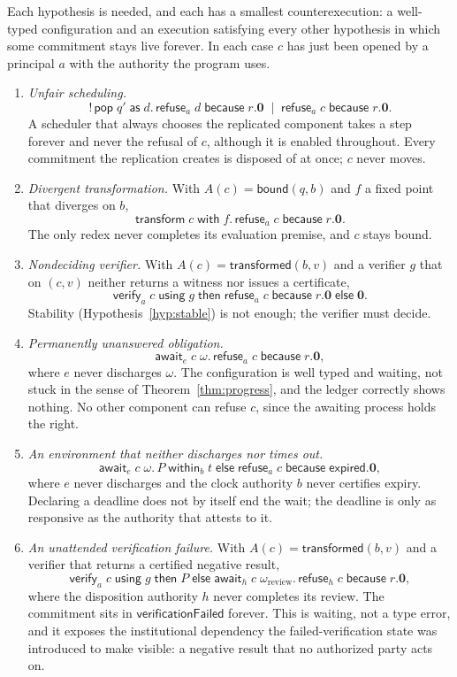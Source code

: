 \documentclass[11pt,openany]{book}
\theoremstyle{remark}
\begin{document}
Each hypothesis is needed, and each has a smallest counterexecution: a
well-typed configuration and an execution satisfying every other
hypothesis in which some commitment stays live forever. In each case $c$
has just been opened by a principal $a$ with the authority the program
uses.
\begin{enumerate}[leftmargin=1.5em]
\item \emph{Unfair scheduling.}
\[
!\,\mathsf{pop}\;q'\;\mathsf{as}\;d.\,\mathsf{refuse}_a\;d\;\mathsf{because}\;r.\mathbf 0
\;\mid\;\mathsf{refuse}_a\;c\;\mathsf{because}\;r.\mathbf 0 .
\]
A scheduler that always chooses the replicated component takes a step
forever and never the refusal of $c$, although it is enabled throughout.
Every commitment the replication creates is disposed of at once; $c$
never moves.
\item \emph{Divergent transformation.} With $A(c)=\mathsf{bound}(q,b)$ and
$f$ a fixed point that diverges on $b$,
\[
\mathsf{transform}\;c\;\mathsf{with}\;f.\,\mathsf{refuse}_a\;c\;\mathsf{because}\;r.\mathbf 0 .
\]
The only redex never completes its evaluation premise, and $c$ stays
bound.
\item \emph{Nondeciding verifier.} With $A(c)=\mathsf{transformed}(b,v)$
and a verifier $g$ that on $(c,v)$ neither returns a witness nor issues a
certificate,
\[
\mathsf{verify}_a\;c\;\mathsf{using}\;g\;\mathsf{then}\;
\mathsf{refuse}_a\;c\;\mathsf{because}\;r.\mathbf 0\;\mathsf{else}\;\mathbf 0 .
\]
Stability (Hypothesis~\ref{hyp:stable}) is not enough; the verifier must
decide.
\item \emph{Permanently unanswered obligation.}
\[
\mathsf{await}_e\;c\;\omega.\,\mathsf{refuse}_a\;c\;\mathsf{because}\;r.\mathbf 0,
\]
where $e$ never discharges $\omega$. The configuration is well typed and
waiting, not stuck in the sense of Theorem~\ref{thm:progress}, and the
ledger correctly shows nothing. No other component can refuse $c$, since
the awaiting process holds the right.
\item \emph{An environment that neither discharges nor times out.}
\[
\mathsf{await}_e\;c\;\omega.\,P\;\mathsf{within}_b\;t\;\mathsf{else}\;
\mathsf{refuse}_a\;c\;\mathsf{because}\;\mathsf{expired}.\mathbf 0,
\]
where $e$ never discharges and the clock authority $b$ never certifies
expiry. Declaring a deadline does not by itself end the wait; the
deadline is only as responsive as the authority that attests to it.
\item \emph{An unattended verification failure.} With
$A(c)=\mathsf{transformed}(b,v)$ and a verifier that returns a certified
negative result,
\[
\mathsf{verify}_a\;c\;\mathsf{using}\;g\;\mathsf{then}\;P\;\mathsf{else}\;
\mathsf{await}_h\;c\;\omega_{\mathrm{review}}.\,
\mathsf{refuse}_h\;c\;\mathsf{because}\;r.\mathbf 0,
\]
where the disposition authority $h$ never completes its review. The
commitment sits in $\mathsf{verificationFailed}$ forever. This is waiting,
not a type error, and it exposes the institutional dependency the
failed-verification state was introduced to make visible: a negative
result that no authorized party acts on.
\end{enumerate}
\end{document}

